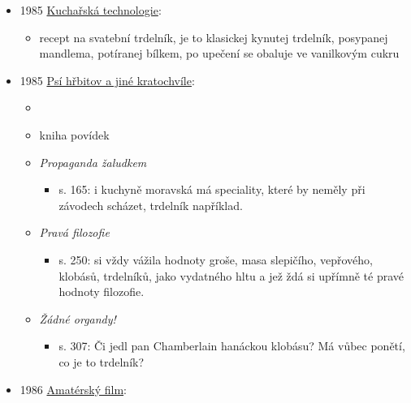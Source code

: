 \begin{itemize}
  \begin{itemize}
  \tightlist
  \item
    Haló sobota. 15.12.1984. Praha: Vydavatelství Florenc, roč. 1984, č.
    50, s. 10. ISSN 0323-0880.
  \item
    \emph{Staropražský vánoční trh} výstava Bonsai klubu Praha
  \item
    jeden stánek nabízí orientální cukroví, homole, cukrkandl, trdlovec
    a jiné sladkosti
  \end{itemize}
\item
  1985
  \href{https://ceskadigitalniknihovna.cz/uuid/uuid:a10e2690-0153-11e4-99ee-001018b5eb5c}{Kuchařská
  technologie}:

  \begin{itemize}
  \tightlist
  \item
    recept na svatební trdelník, je to klasickej kynutej trdelník,
    posypanej mandlema, potíranej bílkem, po upečení se obaluje ve
    vanilkovým cukru
  \end{itemize}
\item
  1985
  \href{https://www.digitalniknihovna.cz/mzk/uuid/uuid:62a5b170-985e-11e2-9a08-005056827e52}{Psí
  hřbitov a jiné kratochvíle}:

  \begin{itemize}
  \tightlist
  \item
  \item
    kniha povídek
  \item
    \emph{Propaganda žaludkem}

    \begin{itemize}
    \tightlist
    \item
      s. 165: i kuchyně moravská má speciality, které by neměly při
      závodech scházet, trdelník například.
    \end{itemize}
  \item
    \emph{Pravá filozofie}

    \begin{itemize}
    \tightlist
    \item
      s. 250: si vždy vážila hodnoty groše, masa slepičího, vepřového,
      klobásů, trdelníků, jako vydatného hltu a jež ždá si upřímně té
      pravé hodnoty filozofie.
    \end{itemize}
  \item
    \emph{Žádné organdy!}

    \begin{itemize}
    \tightlist
    \item
      s. 307: Či jedl pan Chamberlain hanáckou klobásu? Má vůbec ponětí,
      co je to trdelník?
    \end{itemize}
  \end{itemize}
\item
  1986
  \href{https://ceskadigitalniknihovna.cz/uuid/uuid:6c7effb0-14fa-11e5-b9a6-5ef3fc9ae867}{Amatérský
  film}:


\end{itemize}
